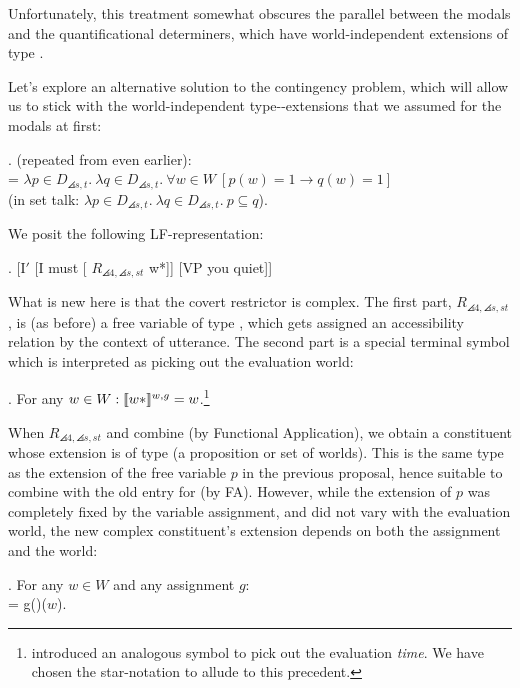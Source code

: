 Unfortunately, this treatment somewhat obscures the parallel between the modals and the quantificational determiners, which have world-independent extensions of type .

Let's explore an alternative solution to the contingency problem, which will allow us to stick with the world-independent type--extensions that we assumed for the modals at first:

\ex. (repeated from even earlier): \\
 = $\lambda p\in D_{\angles{s,t}}.\ \lambda q\in D_{\angles{s,t}}.\ \forall w\in W\ [p(w)=1 \rightarrow q(w)=1]$\\
\null\hfill(in set talk: $\lambda p \in D_{\angles{s,t}}.\ \lambda q \in D_{\angles{s,t}}.\ p \ensuremath{\subseteq} q$).

We posit the following LF-representation:

\exi. \label{brandlf} [I$'$ [I must [ $R_{\angles{4,\angles{s,st}}}$ w*]] [VP you quiet]]

What is new here is that the covert restrictor is complex. The first
part, $R_{\angles{4,\angles{s,st}}}$, is (as before) a free variable
of type , which gets assigned an accessibility relation
by the context of utterance. %
%
The second part is a special terminal symbol which is interpreted as picking out the evaluation world:

\ex. For any $w\in W: \llbracket w* \rrbracket^{w,g} = w$.\footnote{\citet{dowty:1982:time-adverbs} introduced an analogous symbol to pick out the evaluation \emph{time}. We have chosen the star-notation to allude to this precedent.}

When $R_{\angles{4,\angles{s,st}}}$ and  combine (by Functional Application), we obtain a constituent whose extension is of type  (a proposition or set of worlds). This is the same type as the extension of the free variable $p$ in the previous proposal, hence suitable to combine with the old entry for  (by FA). However, while the extension of $p$ was completely fixed by the variable assignment, and did not vary with the evaluation world, the new complex constituent's extension depends on both the assignment and the world:

\ex. For any $w\in W$ and any assignment $g$: \\
 = g()($w$).

